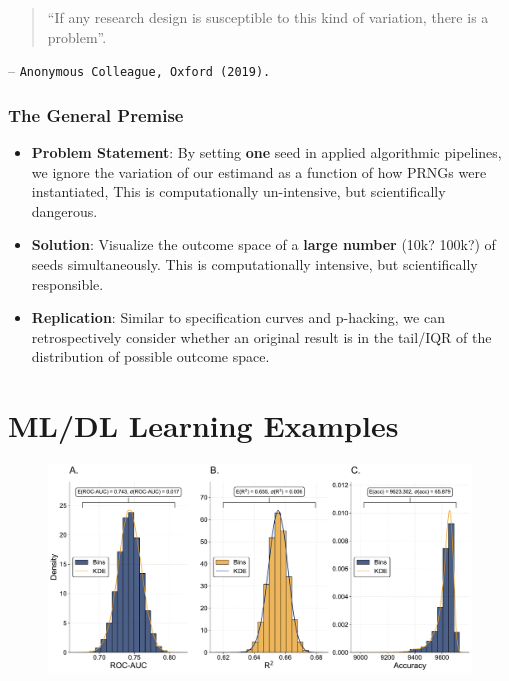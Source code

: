 \documentclass[12pt]{beamer}
\begin{document}
\begin{frame}
\begin{center}
\begin{quote}
``If any research design is susceptible to this kind of variation, there is a problem''.
\vspace{.4in}
\end{quote}
\begin{small}
\quad \quad \quad \quad \quad \quad \quad \quad \quad \quad -- \texttt{Anonymous Colleague, Oxford (2019).}
\end{small}
\end{center}
\end{frame}

\begin{frame}
\frametitle{The General Premise}
\begin{itemize}
\item \textbf{\color{myred}Problem Statement\color{black}}: By setting \textbf{one} seed in applied algorithmic pipelines, we ignore the variation of our estimand as a function of how PRNGs were instantiated, This is computationally un-intensive, but scientifically dangerous.\\ \pause \vspace{.15in}
\item \textbf{\color{myred}Solution\color{black}}: Visualize the outcome space of a \textbf{large number} (10k? 100k?) of seeds simultaneously. This is computationally intensive, but scientifically responsible.\\ \pause \vspace{.15in}
\item \textbf{\color{myred}Replication\color{black}}: Similar to specification curves and p-hacking, we can retrospectively consider whether an original result is in the tail/IQR of the distribution of possible outcome space.
\end{itemize}
\end{frame}

\section{ML/DL Learning Examples}
\begin{frame}
	\begin{center}
		\begin{figure}
			\includegraphics[width=\textwidth]{figures/prediction_seeds.pdf}
		\end{figure}
	\end{center}
\end{frame}
\end{document}
